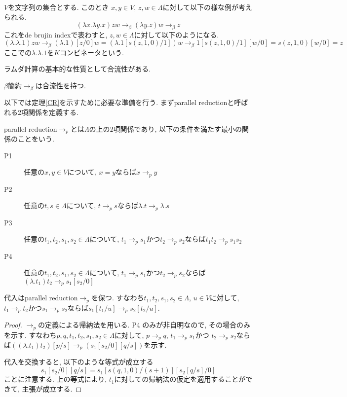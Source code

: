 \documentclass[12pt]{ltjsarticle}
\begin{document}
\begin{ex}[$K$ コンビネータ]
 $V$を文字列の集合とする. このとき $x, y \in V$, $z, w \in \Lambda$に対して以下の様な例が考えられる.
 \[
 (\lambda x. \lambda y. x) z w \rightarrow_{\beta} (\lambda y. z) w \rightarrow_{\beta} z
 \]
 これをde brujin indexで表わすと, $z, w \in \Lambda$に対して以下のようになる.
 \[
 (\lambda. \lambda. 1) z w \rightarrow_{\beta} (\lambda. 1)[z/0] w = (\lambda. 1[s (z, 1, 0)/1]) w \rightarrow_{\beta} 1[s (z, 1, 0)/1][w/0] = s (z, 1, 0)[w/0] = z
 \]
ここでの$\lambda. \lambda. 1$を$K$コンビネータという.
\end{ex}

ラムダ計算の基本的な性質として合流性がある.

\begin{thm}\label{CR}
 $\beta$簡約$\rightarrow_{\beta}$は合流性を持つ.
\end{thm}

以下では定理\ref{CR}を示すために必要な準備を行う. まずparallel reductionと呼ばれる2項関係を定義する.

\begin{defn}
 parallel reduction$\rightarrow_{p}$とは$\Lambda$の上の$2$項関係であり, 以下の条件を満たす最小の関係のことをいう.
 \begin{description}
  \item[P1] 任意の$x, y \in V$について, $x = y$ならば$x \rightarrow_{p} y$
  \item[P2] 任意の$t, s \in \Lambda$について, $t \rightarrow_{p} s$ならば$\lambda. t \rightarrow_{p} \lambda. s$
  \item[P3] 任意の$t_1, t_2, s_1, s_2 \in \Lambda$について,
        $t_1 \rightarrow_{p} s_1$かつ$t_2 \rightarrow_{p} s_2$ならば$t_1 t_2 \rightarrow_{p} s_1 s_2$
  \item[P4] 任意の$t_1, t_2, s_1, s_2 \in \Lambda$について,
        $t_1 \rightarrow_{p} s_1$かつ$t_2 \rightarrow_{p} s_2$ならば$(\lambda. t_1) t_2 \rightarrow_{p} s_1[s_2/0]$
 \end{description}
\end{defn}

\begin{lem}\label{spp}
 代入はparallel reduction$\rightarrow_{p}$を保つ. すなわち$t_1, t_2, s_1, s_2 \in \Lambda$, $u \in V$に対して, $t_1 \rightarrow_{p} t_2$かつ$s_1 \rightarrow_{p} s_2$ならば$s_1[t_1/u] \rightarrow_{p} s_2[t_2/u]$.
\end{lem}

\begin{proof}
 $\rightarrow_{p}$の定義による帰納法を用いる. P4%
のみが非自明なので, その場合のみを示す.
 すなわち$p, q, t_1, t_2, s_1, s_2 \in \Lambda$に対して,
$p \rightarrow_{p} q$, $t_1 \rightarrow_{p} s_1$かつ $t_2 \rightarrow_{p} s_2$ならば$((\lambda. t_1) t_2) [p / s] \rightarrow_{p} (s_1 [s_2 / 0] [q / s])$を示す.
 
 代入を交換すると, 以下のような等式が成立する
 \[
 s_1 [s_2 / 0][q / s] = s_1 [s(q, 1, 0) / (s + 1)][s_2 [q / s] / 0]
 \]
 ことに注意する. 上の等式により, $t_1$に対しての帰納法の仮定を適用することができて, 主張が成立する.
\end{proof}
\end{document}
